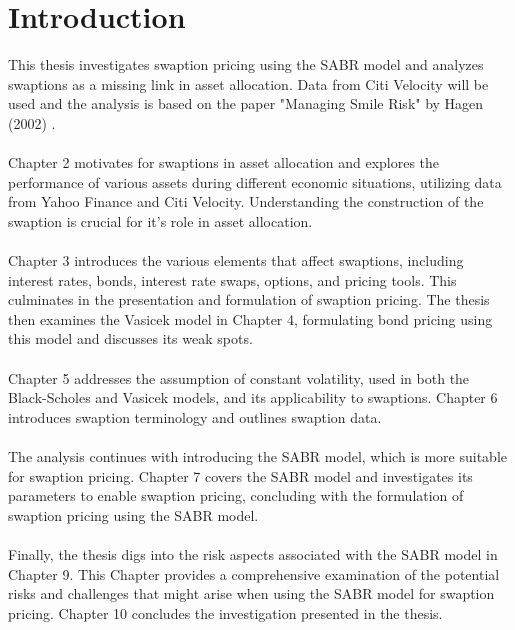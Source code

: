 \section{Introduction}

This thesis investigates swaption pricing using the SABR model
and analyzes swaptions as a missing link in asset allocation. 
Data from Citi Velocity will be used and the analysis is 
based on the paper "Managing Smile Risk" by Hagen (2002) 
\cite{Smile}.
\\\\
Chapter 2 motivates for swaptions 
in asset allocation and explores the performance 
of various assets during different economic situations, 
utilizing data from Yahoo Finance and Citi Velocity. 
Understanding the construction of the swaption
is crucial for it's role in asset allocation.
\\\\
Chapter 3 introduces the various elements that affect 
swaptions, including interest rates, bonds, interest 
rate swaps, options, and pricing tools. This culminates 
in the presentation and formulation of swaption pricing. 
The thesis then examines the Vasicek model in Chapter 4, 
formulating bond pricing using this model and discusses its 
weak spots.
\\\\
Chapter 5 addresses the assumption of constant volatility, 
used in both the Black-Scholes and Vasicek models, 
and its applicability to swaptions. Chapter 6 introduces 
swaption terminology and outlines swaption data.
\\\\
The analysis continues with introducing the SABR model, which is 
more suitable for swaption pricing. Chapter 7 covers the SABR model 
and investigates its parameters to enable swaption pricing, 
concluding with the formulation of swaption pricing using 
the SABR model.
\\\\
Finally, the thesis digs into the risk aspects associated 
with the SABR model in Chapter 9. This Chapter provides a 
comprehensive examination of the potential risks and 
challenges that might arise when using the SABR model 
for swaption pricing.
Chapter 10 concludes the investigation presented in the thesis. 

